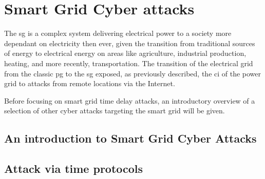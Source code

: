 



\chapter{Smart Grid Cyber attacks}















The \acrfull{sg} is a complex system delivering electrical power to a society more dependant on electricity then ever, given the transition from traditional sources of energy to electrical energy on areas like agriculture, industrial production, heating, and more recently, transportation.
The transition of the electrical grid from the classic \acrlong{pg} to the \acrlong{sg} exposed, as previously described, the \acrlong{ci} of the power grid to attacks from remote locations via the Internet.

Before focusing on smart grid time delay attacks, an introductory overview of a selection of other cyber attacks targeting  the smart grid will be given.



\section{An introduction to Smart Grid Cyber Attacks}


\section{Attack via time protocols}

